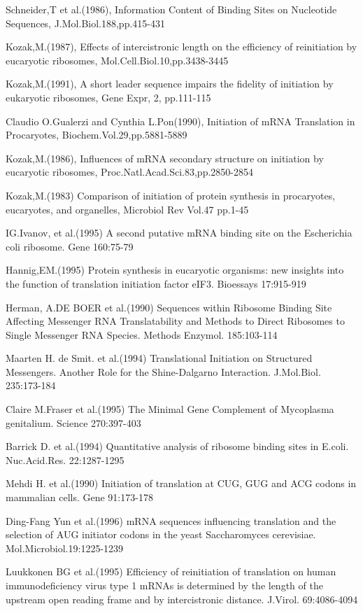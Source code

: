 \begin{thebibliography}{99}
 Schneider,T et al.(1986),
Information Content of Binding Sites on Nucleotide Sequences,
J.Mol.Biol.188,pp.415-431

 Kozak,M.(1987),
 Effects of intercistronic length on the efficiency of reinitiation
by eucaryotic ribosomes,
Mol.Cell.Biol.10,pp.3438-3445

 Kozak,M.(1991),
 A short leader sequence impairs the fidelity of initiation by eukaryotic
ribosomes, Gene Expr, 2, pp.111-115

 Claudio O.Gualerzi and Cynthia L.Pon(1990),
Initiation of mRNA Translation in Procaryotes,
Biochem.Vol.29,pp.5881-5889

 Kozak,M.(1986),
Influences of mRNA secondary structure on initiation by eucaryotic 
ribosomes,
Proc.Natl.Acad.Sci.83,pp.2850-2854


 Kozak,M.(1983)
Comparison of initiation of protein synthesis in procaryotes, eucaryotes,
and organelles,
Microbiol Rev Vol.47 pp.1-45

 IG.Ivanov, et al.(1995)
A second putative mRNA binding site on the Escherichia coli ribosome.
Gene 160:75-79

 Hannig,EM.(1995)
Protein synthesis in eucaryotic organisms: new insights into the function
of translation initiation factor eIF3.
Bioessays 17:915-919

 Herman, A.DE BOER et al.(1990)
Sequences within Ribosome Binding Site Affecting Messenger RNA Translatability
and Methods to Direct Ribosomes to Single Messenger RNA Species.
Methods Enzymol. 185:103-114

 Maarten H. de Smit. et al.(1994)
Translational Initiation on Structured Messengers.
Another Role for the Shine-Dalgarno Interaction.
J.Mol.Biol. 235:173-184

 Claire M.Fraser et al.(1995)
The Minimal Gene Complement of Mycoplasma genitalium.
Science 270:397-403

Barrick D. et al.(1994)
Quantitative analysis of ribosome binding sites in E.coli.
Nuc.Acid.Res. 22:1287-1295

Mehdi H. et al.(1990)
Initiation of translation at CUG, GUG and ACG codons in mammalian
cells.
Gene 91:173-178

Ding-Fang Yun et al.(1996)
mRNA sequences influencing translation and the selection of AUG
initiator codons in the yeast Saccharomyces cerevisiae.
Mol.Microbiol.19:1225-1239

Luukkonen BG et al.(1995)
Efficiency of reinitiation of translation on human immunodeficiency
virus type 1 mRNAs is determined by the length of the upstream open
reading frame and by intercistronic distance.
J.Virol. 69:4086-4094

\end{thebibliography}






